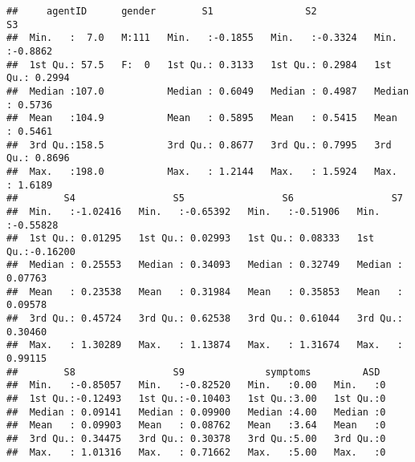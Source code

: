 \documentclass[]{article}
\newenvironment{Shaded}{\begin{snugshade}}{\end{snugshade}}
\newcommand{\KeywordTok}[1]{\textcolor[rgb]{0.13,0.29,0.53}{\textbf{#1}}}
\newcommand{\StringTok}[1]{\textcolor[rgb]{0.31,0.60,0.02}{#1}}
\newcommand{\CommentTok}[1]{\textcolor[rgb]{0.56,0.35,0.01}{\textit{#1}}}
\newcommand{\OperatorTok}[1]{\textcolor[rgb]{0.81,0.36,0.00}{\textbf{#1}}}
\newcommand{\NormalTok}[1]{#1}
\begin{document}
\begin{verbatim}
##     agentID      gender        S1                S2                S3         
##  Min.   :  7.0   M:111   Min.   :-0.1855   Min.   :-0.3324   Min.   :-0.8862  
##  1st Qu.: 57.5   F:  0   1st Qu.: 0.3133   1st Qu.: 0.2984   1st Qu.: 0.2994  
##  Median :107.0           Median : 0.6049   Median : 0.4987   Median : 0.5736  
##  Mean   :104.9           Mean   : 0.5895   Mean   : 0.5415   Mean   : 0.5461  
##  3rd Qu.:158.5           3rd Qu.: 0.8677   3rd Qu.: 0.7995   3rd Qu.: 0.8696  
##  Max.   :198.0           Max.   : 1.2144   Max.   : 1.5924   Max.   : 1.6189  
##        S4                 S5                 S6                 S7          
##  Min.   :-1.02416   Min.   :-0.65392   Min.   :-0.51906   Min.   :-0.55828  
##  1st Qu.: 0.01295   1st Qu.: 0.02993   1st Qu.: 0.08333   1st Qu.:-0.16200  
##  Median : 0.25553   Median : 0.34093   Median : 0.32749   Median : 0.07763  
##  Mean   : 0.23538   Mean   : 0.31984   Mean   : 0.35853   Mean   : 0.09578  
##  3rd Qu.: 0.45724   3rd Qu.: 0.62538   3rd Qu.: 0.61044   3rd Qu.: 0.30460  
##  Max.   : 1.30289   Max.   : 1.13874   Max.   : 1.31674   Max.   : 0.99115  
##        S8                 S9              symptoms         ASD   
##  Min.   :-0.85057   Min.   :-0.82520   Min.   :0.00   Min.   :0  
##  1st Qu.:-0.12493   1st Qu.:-0.10403   1st Qu.:3.00   1st Qu.:0  
##  Median : 0.09141   Median : 0.09900   Median :4.00   Median :0  
##  Mean   : 0.09903   Mean   : 0.08762   Mean   :3.64   Mean   :0  
##  3rd Qu.: 0.34475   3rd Qu.: 0.30378   3rd Qu.:5.00   3rd Qu.:0  
##  Max.   : 1.01316   Max.   : 0.71662   Max.   :5.00   Max.   :0
\end{verbatim}

\begin{Shaded}
\end{Shaded}
\end{document}
